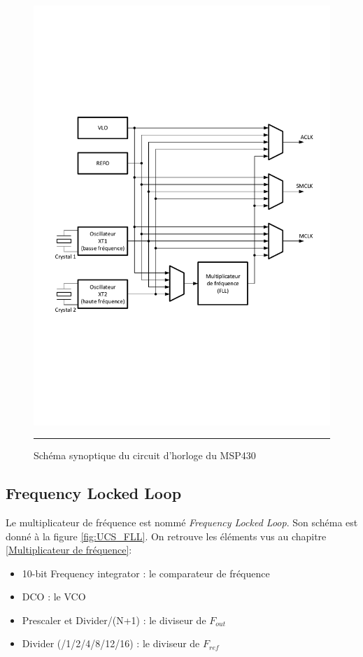 \begin{figure}[htb]
  \centering
  \includegraphics [angle=0, width=14cm]{./Figures/Chap6_Horloges/UCS_Blocs.pdf}
  \rule{35em}{0.5pt}
  \caption{Schéma synoptique du circuit d'horloge du MSP430}
  \label{fig:UCS_Blocs}
\end{figure}

\subsection{Frequency Locked Loop}
Le multiplicateur de fréquence est nommé \textit{Frequency Locked Loop}. Son schéma est donné à la figure \ref{fig:UCS_FLL}. On retrouve les éléments vus au chapitre \ref{Multiplicateur de fréquence}:
\begin{itemize}[label=\textbullet,font=\small]
\item 10-bit Frequency integrator : le comparateur de fréquence
\item DCO : le VCO
\item Prescaler et Divider/(N+1) : le diviseur de $F_{out}$
\item Divider (/1/2/4/8/12/16) : le diviseur de $F_{ref}$
\end{itemize}

